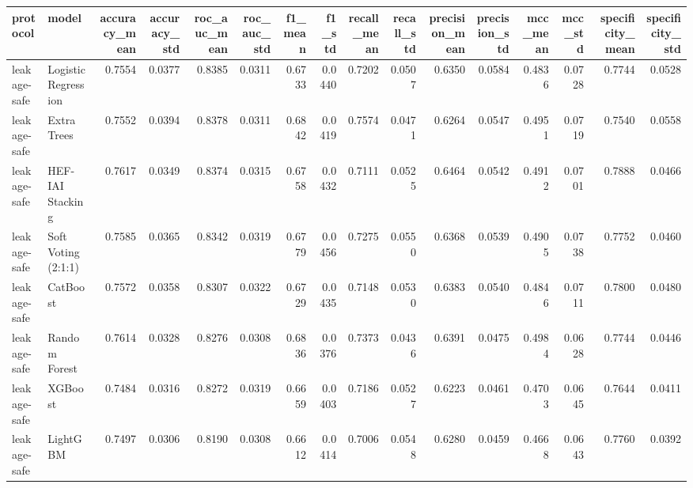 \begin{tabular}{llrrrrrrrrrrrrrr}
\toprule
protocol & model & accuracy\_mean & accuracy\_std & roc\_auc\_mean & roc\_auc\_std & f1\_mean & f1\_std & recall\_mean & recall\_std & precision\_mean & precision\_std & mcc\_mean & mcc\_std & specificity\_mean & specificity\_std \\
\midrule
leakage-safe & Logistic Regression & 0.7554 & 0.0377 & 0.8385 & 0.0311 & 0.6733 & 0.0440 & 0.7202 & 0.0507 & 0.6350 & 0.0584 & 0.4836 & 0.0728 & 0.7744 & 0.0528 \\
leakage-safe & Extra Trees & 0.7552 & 0.0394 & 0.8378 & 0.0311 & 0.6842 & 0.0419 & 0.7574 & 0.0471 & 0.6264 & 0.0547 & 0.4951 & 0.0719 & 0.7540 & 0.0558 \\
leakage-safe & HEF-IAI Stacking & 0.7617 & 0.0349 & 0.8374 & 0.0315 & 0.6758 & 0.0432 & 0.7111 & 0.0525 & 0.6464 & 0.0542 & 0.4912 & 0.0701 & 0.7888 & 0.0466 \\
leakage-safe & Soft Voting (2:1:1) & 0.7585 & 0.0365 & 0.8342 & 0.0319 & 0.6779 & 0.0456 & 0.7275 & 0.0550 & 0.6368 & 0.0539 & 0.4905 & 0.0738 & 0.7752 & 0.0460 \\
leakage-safe & CatBoost & 0.7572 & 0.0358 & 0.8307 & 0.0322 & 0.6729 & 0.0435 & 0.7148 & 0.0530 & 0.6383 & 0.0540 & 0.4846 & 0.0711 & 0.7800 & 0.0480 \\
leakage-safe & Random Forest & 0.7614 & 0.0328 & 0.8276 & 0.0308 & 0.6836 & 0.0376 & 0.7373 & 0.0436 & 0.6391 & 0.0475 & 0.4984 & 0.0628 & 0.7744 & 0.0446 \\
leakage-safe & XGBoost & 0.7484 & 0.0316 & 0.8272 & 0.0319 & 0.6659 & 0.0403 & 0.7186 & 0.0527 & 0.6223 & 0.0461 & 0.4703 & 0.0645 & 0.7644 & 0.0411 \\
leakage-safe & LightGBM & 0.7497 & 0.0306 & 0.8190 & 0.0308 & 0.6612 & 0.0414 & 0.7006 & 0.0548 & 0.6280 & 0.0459 & 0.4668 & 0.0643 & 0.7760 & 0.0392 \\
\bottomrule
\end{tabular}
